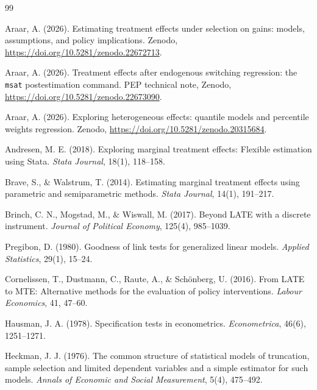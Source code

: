 \documentclass[11pt,a4paper]{article}
\theoremstyle{plain}
\theoremstyle{definition}
\theoremstyle{remark}
\newcommand{\1}{\mathbf{1}}
\newcommand{\cmd}[1]{\texttt{#1}}
\begin{document}
\begin{thebibliography}{99}\small

 Araar, A. (2026). Estimating treatment
effects under selection on gains: models, assumptions, and policy
implications. Zenodo, \url{https://doi.org/10.5281/zenodo.22672713}.

 Araar, A. (2026). Treatment effects after
endogenous switching regression: the \cmd{msat} postestimation command. PEP
technical note, Zenodo, \url{https://doi.org/10.5281/zenodo.22673090}.

 Araar, A. (2026). Exploring heterogeneous
effects: quantile models and percentile weights regression. Zenodo,
\url{https://doi.org/10.5281/zenodo.20315684}.

 Andresen, M. E. (2018). Exploring
marginal treatment effects: Flexible estimation using Stata. \textit{Stata
Journal}, 18(1), 118--158.

 Brave, S., \& Walstrum, T.
(2014). Estimating marginal treatment effects using parametric and
semiparametric methods. \textit{Stata Journal}, 14(1), 191--217.

 Brinch, C. N., Mogstad, M., \&
Wiswall, M. (2017). Beyond LATE with a discrete instrument. \textit{Journal
of Political Economy}, 125(4), 985--1039.

 Pregibon, D. (1980). Goodness of link
tests for generalized linear models. \textit{Applied Statistics}, 29(1),
15--24.

 Cornelissen, T.,
Dustmann, C., Raute, A., \& Sch\"onberg, U. (2016). From LATE to MTE:
Alternative methods for the evaluation of policy interventions.
\textit{Labour Economics}, 41, 47--60.

 Hausman, J. A. (1978). Specification
tests in econometrics. \textit{Econometrica}, 46(6), 1251--1271.

 Heckman, J. J. (1976). The common
structure of statistical models of truncation, sample selection and limited
dependent variables and a simple estimator for such models. \textit{Annals
of Economic and Social Measurement}, 5(4), 475--492.


\end{thebibliography}
\end{document}
